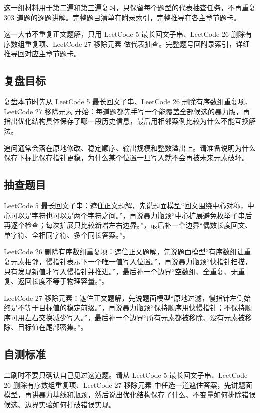 
这一组材料用于第二遍和第三遍复习，只保留每个题型的代表抽查任务，不再重复 303 道题的逐题讲解。完整题目清单在附录索引，完整推导在各主章节题卡。

这一大节不重复正文题解，只用 LeetCode 5 最长回文子串、LeetCode 26 删除有序数组重复项、LeetCode 27 移除元素 做代表抽查。完整题号回附录索引，详细推导回对应主章节题卡。

\subsection{复盘目标}

复盘本节时先从 LeetCode 5 最长回文子串、LeetCode 26 删除有序数组重复项、LeetCode 27 移除元素 开始：每道题都先手写一个能覆盖全部候选的暴力版，再指出优化结构具体保存了哪一段历史信息，最后用相邻案例比较为什么不能互换解法。

追问通常会落在原地修改、稳定顺序、输出规模和整数溢出上。请准备说明为什么保存下标比保存指针更稳，为什么某个位置一旦写入就不会再被未来元素破坏。

\subsection{抽查题目}

LeetCode 5 最长回文子串：遮住正文题解，先说题面模型“回文围绕中心对称，中心可以是字符也可以是两个字符之间。”，再说暴力瓶颈“中心扩展避免枚举子串后再逐个检查；每次扩展只比较新增左右边界。”，最后补一个边界“偶数长度回文、单字符、全相同字符、多个同长答案。”。

LeetCode 26 删除有序数组重复项：遮住正文题解，先说题面模型“有序数组让重复元素相邻，慢指针表示下一个唯一值写入位置。”，再说暴力瓶颈“快指针扫描，只有发现新值才写入慢指针并推进。”，最后补一个边界“空数组、全重复、无重复、返回长度不等于物理容量。”。

LeetCode 27 移除元素：遮住正文题解，先说题面模型“原地过滤，慢指针左侧始终是不等于目标值的稳定前缀。”，再说暴力瓶颈“保持顺序用快慢指针；不保持顺序可用左右交换减少写入。”，最后补一个边界“所有元素都被移除、没有元素被移除、目标值在尾部密集。”。

\subsection{自测标准}

二刷时不要只确认自己见过这道题。请从 LeetCode 5 最长回文子串、LeetCode 26 删除有序数组重复项、LeetCode 27 移除元素 中任选一道遮住答案，先讲题面模型，再讲暴力基线和瓶颈，然后说出优化结构保存了什么、不变量如何排除错误候选、边界实验如何打破错误实现。

